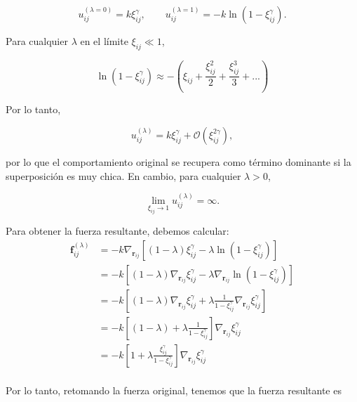 \documentclass[11pt,a4paper]{article}
\begin{document}
\begin{equation}
u_{ij}^{(\lambda=0)}
=k\xi_{ij}^{\gamma},
\qquad
u_{ij}^{(\lambda=1)}
=-k\ln\left(1-\xi_{ij}^{\gamma}\right).
\end{equation}

Para cualquier $\lambda$ en el límite $\xi_{ij}\ll1$,

\begin{equation}
	\ln\left(1-\xi_{ij}^{\gamma}\right) \approx -\left(\xi_{ij}+\frac{\xi_{ij}^{2}}{2}+\frac{\xi_{ij}^{3}}{3}+...\right)
\end{equation}

Por lo tanto,

\begin{equation}
u_{ij}^{(\lambda)}
=
k\xi_{ij}^{\gamma}
+
\mathcal O\left(\xi_{ij}^{2\gamma}\right),
\end{equation}

por lo que el comportamiento original se recupera como término dominante si la superposición es muy chica. En cambio, para cualquier $\lambda>0$,

\begin{equation}
\lim_{\xi_{ij}\rightarrow1}
u_{ij}^{(\lambda)}
=\infty.
\end{equation}

Para obtener la fuerza resultante, debemos calcular:
\begin{equation}
	\begin{split}
		\mathbf f_{ij}^{(\lambda)}
		&= -k\nabla_{\mathbf{r}_{ij}} \left[ (1-\lambda)\xi_{ij}^{\gamma} - \lambda\ln\left(1-\xi_{ij}^{\gamma}\right) \right] \\
		&= -k \left[ (1-\lambda)\nabla_{\mathbf{r}_{ij}}\xi_{ij}^{\gamma} - \lambda \nabla_{\mathbf{r}_{ij}} \ln\left(1-\xi_{ij}^{\gamma}\right) \right] \\
		&= -k \left[ (1-\lambda)\nabla_{\mathbf{r}_{ij}}\xi_{ij}^{\gamma} + \lambda  \frac{1}{1-\xi_{ij}^{\gamma}} \nabla_{\mathbf{r}_{ij}}\xi_{ij}^{\gamma} \right]\\
		&= -k \left[ (1-\lambda) + \lambda  \frac{1}{1-\xi_{ij}^{\gamma}}  \right]\nabla_{\mathbf{r}_{ij}}\xi_{ij}^{\gamma}\\
		&= -k \left[1 + \lambda  \frac{\xi_{ij}^{\gamma}}{1-\xi_{ij}^{\gamma}}  \right]\nabla_{\mathbf{r}_{ij}}\xi_{ij}^{\gamma}\\
	\end{split}
\end{equation}

Por lo tanto, retomando la fuerza original, tenemos que la fuerza resultante es
\end{document}
